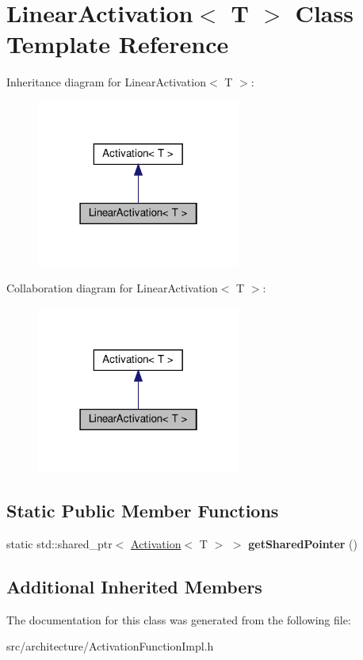 \hypertarget{classLinearActivation}{}\section{Linear\+Activation$<$ T $>$ Class Template Reference}
\label{classLinearActivation}


Inheritance diagram for Linear\+Activation$<$ T $>$\+:
\nopagebreak
\begin{figure}[H]
\begin{center}
\leavevmode
\includegraphics[width=190pt]{classLinearActivation__inherit__graph}
\end{center}
\end{figure}


Collaboration diagram for Linear\+Activation$<$ T $>$\+:
\nopagebreak
\begin{figure}[H]
\begin{center}
\leavevmode
\includegraphics[width=190pt]{classLinearActivation__coll__graph}
\end{center}
\end{figure}
\subsection*{Static Public Member Functions}
\begin{DoxyCompactItemize}
\item 
\mbox{\label{classLinearActivation_ad276772f195a8e32e061a16e1103a518}} 
static std\+::shared\+\_\+ptr$<$ \hyperlink{classActivation}{Activation}$<$ T $>$ $>$ {\bfseries get\+Shared\+Pointer} ()
\end{DoxyCompactItemize}
\subsection*{Additional Inherited Members}


The documentation for this class was generated from the following file\+:\begin{DoxyCompactItemize}
\item 
src/architecture/Activation\+Function\+Impl.\+h\end{DoxyCompactItemize}
